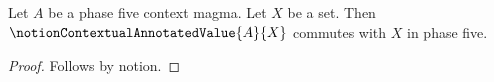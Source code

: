 

\begin{proposition}\label{notion_contextual_annotated_consumer}
    Let $A$ be a phase five context magma.
    Let $X$ be a set.
    Then $\notionContextualAnnotatedValue{A}{X}$ commutes with $X$ in phase five.
\end{proposition}
\begin{proof}
    Follows by notion.
\end{proof}
